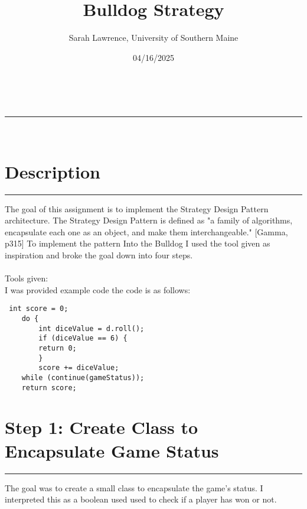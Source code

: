 \documentclass[a4paper,11pt]{article}
\makeatletter
\newcommand{\linia}{\rule{\linewidth}{0.5pt}}
\renewcommand{\maketitle}{
\begin{center}
\vspace{2ex}
{\huge \textsc{\@title}}
\vspace{1ex}
\\
\linia\\
\@author \hfill \@date
\vspace{4ex}
\end{center}
}
\makeatother
\begin{document}
\title{Bulldog Strategy}

\author{Sarah Lawrence, University of Southern Maine}

\date{04/16/2025}

\maketitle

\section*{Description}
\hrule
\vspace{13pt} %
The goal of this assignment is to implement the Strategy Design Pattern architecture. The Strategy Design Pattern is defined as "a family of algorithms, encapsulate each one as an object, and make them interchangeable." [Gamma, p315] To implement the pattern Into the Bulldog I used the tool given as inspiration and broke the goal down into four steps. \\\\
Tools given:\\
I was provided example code the code is as follows: 
\begin{lstlisting}
 int score = 0;
    do {
        int diceValue = d.roll();
        if (diceValue == 6) {
        return 0;
        }
        score += diceValue;
    while (continue(gameStatus));
    return score;
\end{lstlisting} 

\section*{Step 1: Create Class to Encapsulate Game Status}
\hrule
\vspace{10pt} %
The goal was to create a small class to encapsulate the game's status. I interpreted this as a boolean used used to check if a player has won or not. 

\vspace{5pt} %
\end{document}
